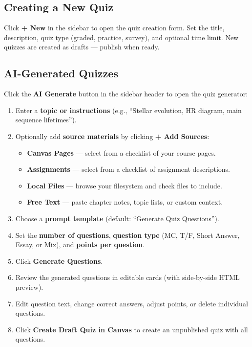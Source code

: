 \documentclass[12pt,letterpaper]{article}
\begin{document}
\subsection{Creating a New Quiz}

Click \textbf{+ New} in the sidebar to open the quiz creation form. Set the title, description, quiz type (graded, practice, survey), and optional time limit. New quizzes are created as drafts --- publish when ready.

\subsection{AI-Generated Quizzes}

Click the \textbf{AI Generate} button in the sidebar header to open the quiz generator:

\begin{enumerate}[leftmargin=*]
    \item Enter a \textbf{topic or instructions} (e.g., ``Stellar evolution, HR diagram, main sequence lifetimes'').
    \item Optionally add \textbf{source materials} by clicking \textbf{+ Add Sources}:
        \begin{itemize}
            \item \textbf{Canvas Pages} --- select from a checklist of your course pages.
            \item \textbf{Assignments} --- select from a checklist of assignment descriptions.
            \item \textbf{Local Files} --- browse your filesystem and check files to include.
            \item \textbf{Free Text} --- paste chapter notes, topic lists, or custom context.
        \end{itemize}
    \item Choose a \textbf{prompt template} (default: ``Generate Quiz Questions'').
    \item Set the \textbf{number of questions}, \textbf{question type} (MC, T/F, Short Answer, Essay, or Mix), and \textbf{points per question}.
    \item Click \textbf{Generate Questions}.
    \item Review the generated questions in editable cards (with side-by-side HTML preview).
    \item Edit question text, change correct answers, adjust points, or delete individual questions.
    \item Click \textbf{Create Draft Quiz in Canvas} to create an unpublished quiz with all questions.
\end{enumerate}
\end{document}
